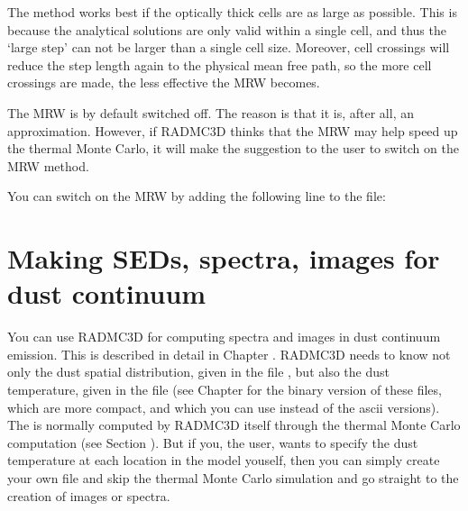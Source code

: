 \documentclass[letterpaper,10pt,english]{sphinxmanual}
\begin{document}
The method works best if the optically thick cells are as large as possible.
This is because the analytical solutions are only valid within a single cell,
and thus the ‘large step’ can not be larger than a single cell size.  Moreover,
cell crossings will reduce the step length again to the physical mean free path,
so the more cell crossings are made, the less effective the MRW becomes.

 The MRW is by default switched off. The reason is that it is, after all,
an approximation. However, if RADMC\sphinxhyphen{}3D thinks that the MRW may help speed up the
thermal Monte Carlo, it will make the suggestion to the user to switch on the
MRW method.

You can switch on the MRW by adding the following line to the
 file:

\begin{sphinxVerbatim}[commandchars=\\\{\}]
  
\end{sphinxVerbatim}


\section{Making SEDs, spectra, images for dust continuum}
\label{\detokenize{dustradtrans:making-seds-spectra-images-for-dust-continuum}}\label{\detokenize{dustradtrans:sec-dust-ray-tracing}}
You can use RADMC\sphinxhyphen{}3D for computing spectra and images in dust continuum
emission. This is described in detail in Chapter
{\hyperref[\detokenize{imagesspectra:chap-images-spectra}]{}}. RADMC\sphinxhyphen{}3D needs to know not only the dust spatial
distribution, given in the file , but also the
dust temperature, given in the file  (see
Chapter {\hyperref[\detokenize{binaryio:chap-binary-io}]{}} for the binary version of these files, which
are more compact, and which you can use instead of the ascii versions). The
 is normally computed by RADMC\sphinxhyphen{}3D itself
through the thermal Monte Carlo computation (see Section
{\hyperref[\detokenize{dustradtrans:sec-dust-thermal-monte-carlo}]{}}). But if you, the user, wants to specify
the dust temperature at each location in the model youself, then you can
simply create your own file  and skip the
thermal Monte Carlo simulation and go straight to the creation of images or
spectra.
\end{document}

